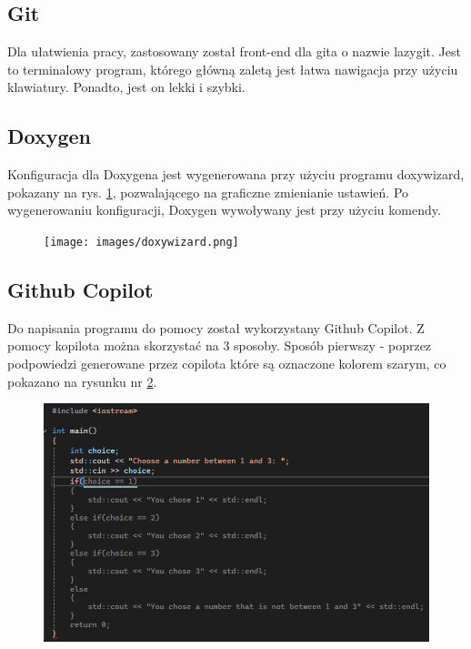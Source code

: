 \subsection{Git}

Dla ułatwienia pracy, zastosowany został front-end dla gita o nazwie lazygit. Jest to terminalowy program, którego główną zaletą jest łatwa nawigacja przy użyciu klawiatury. Ponadto, jest on lekki i szybki.

\subsection{Doxygen}

Konfiguracja dla Doxygena jest wygenerowana przy użyciu programu doxywizard, pokazany na rys. \ref{fig:doxywizard}, pozwalającego na graficzne zmienianie ustawień. Po wygenerowaniu konfiguracji, Doxygen wywoływany jest przy użyciu komendy.

\begin{figure}[H]
	\centering
	\texttt{[image: images/doxywizard.png]}
	\caption{}
	\label{fig:doxywizard}
\end{figure}

\subsection{Github Copilot}
Do napisania programu do pomocy został wykorzystany Github Copilot. Z pomocy kopilota można skorzystać na 3 sposoby. Sposób pierwszy - poprzez podpowiedzi generowane przez copilota które są oznaczone kolorem szarym, co pokazano na rysunku nr \ref{fig:copilotsuggestion}.

\begin{figure}[H]
	\centering
	\includegraphics[width=1\linewidth]{images/CopilotSuggestion}
	\caption{}
	\label{fig:copilotsuggestion}
\end{figure}


